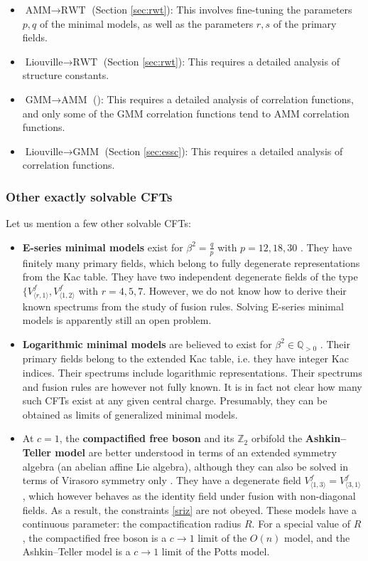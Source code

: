 \documentclass[12pt, a4paper]{article}
\theoremstyle{break}
\begin{document}
\begin{itemize}
 \item $\boxed{\text{AMM}\to \text{RWT}}$ (Section \ref{sec:rwt}): This involves fine-tuning the parameters $p,q$ of the minimal models, as well as the parameters $r,s$ of the primary fields.
  \item $\boxed{\text{Liouville}\to \text{RWT}}$ (Section \ref{sec:rwt}): This requires a detailed analysis of structure constants. 
 \item $\boxed{\text{GMM}\to \text{AMM}}$ (\cite{rib18}): This requires a detailed analysis of correlation functions, and only some of the GMM correlation functions tend to AMM correlation functions. 
 \item $\boxed{\text{Liouville}\to \text{GMM}}$ (Section \ref{sec:essc}): This requires a detailed analysis of correlation functions.
\end{itemize}

\subsubsection{Other exactly solvable CFTs}

Let us mention a few other solvable CFTs:
\begin{itemize}
 \item \textbf{E-series minimal models} exist for $\beta^2=\frac{q}{p}$ with $p=12, 18, 30$ \cite{fms97}. They have finitely many primary fields, which belong to fully degenerate representations from the Kac table. 
They have two independent degenerate fields of the type $\{V^f_{\langle r,1\rangle},V^f_{\langle 1,2\rangle}$ with $r=4,5,7$. 
However, we do not know how to derive their known spectrums from the study of fusion rules. 
Solving E-series minimal models is apparently still an open problem. 
\item \textbf{Logarithmic minimal models} are believed to exist for $\beta^2\in \mathbb{Q}_{>0}$ \cite{prz06}. Their primary fields belong to the extended Kac table, i.e. they have integer Kac indices. Their spectrums include logarithmic representations. Their spectrums and fusion rules are however not fully known. It is in fact not clear how many such CFTs exist at any given central charge. Presumably, they can be obtained as limits of generalized minimal models. 
\item At $c=1$, the \textbf{compactified free boson} and its $\mathbb{Z}_2$ orbifold the \textbf{Ashkin--Teller model} are better understood in terms of an extended symmetry algebra (an abelian affine Lie algebra), although they can also be solved in terms of Virasoro symmetry only \cite{nr21}. They have a degenerate field $V^f_{\langle 1, 3\rangle}=V^f_{\langle 3,1\rangle}$, which however behaves as the identity field under fusion with non-diagonal fields. As a result, the constraints \eqref{sriz} are not obeyed. These models have a continuous parameter: the compactification radius $R$. For a special value of $R$, the compactified free boson is a $c\to 1$ limit of the $O(n)$ model, and the Ashkin--Teller model is a $c\to 1$ limit of the Potts model.
\end{itemize}
\end{document}

